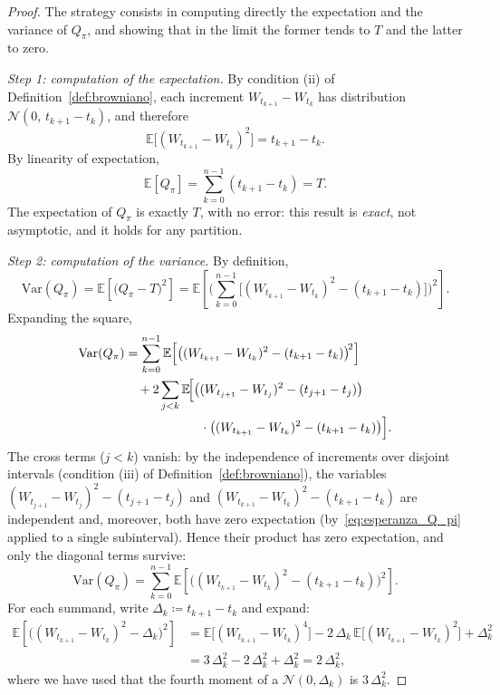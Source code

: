 \documentclass[11pt,a4paper,oneside]{report}
\theoremstyle{plain}
\theoremstyle{definition}
\theoremstyle{remark}
\newcommand{\E}{\mathbb{E}}
\newcommand{\1}{\mathbf{1}}
\newcommand{\eqdef}{\coloneqq}
\begin{document}
\begin{proof}
The strategy consists in computing directly the expectation and the
variance of $Q_\pi$, and showing that in the limit the former tends to
$T$ and the latter to zero.

\emph{Step 1: computation of the expectation.} By condition (ii) of
Definition~\ref{def:browniano}, each increment $W_{t_{k+1}} - W_{t_k}$
has distribution $\mathcal{N}(0,\, t_{k+1} - t_k)$, and therefore
\begin{equation*}
  \E\bigl[(W_{t_{k+1}} - W_{t_k})^2\bigr] = t_{k+1} - t_k.
\end{equation*}
By linearity of expectation,
\begin{equation}\label{eq:esperanza_Q_pi}
  \E[Q_\pi] = \sum_{k=0}^{n-1} (t_{k+1} - t_k) = T.
\end{equation}
The expectation of $Q_\pi$ is exactly $T$, with no error: this result
is \emph{exact}, not asymptotic, and it holds for any partition.

\emph{Step 2: computation of the variance.} By definition,
\begin{equation*}
  \mathrm{Var}(Q_\pi) = \E\!\left[\bigl(Q_\pi - T\bigr)^2\right]
                      = \E\!\left[\biggl(\sum_{k=0}^{n-1}
                          \bigl[(W_{t_{k+1}} - W_{t_k})^2 - (t_{k+1} -
                          t_k)\bigr]\biggr)^{\!2}\right].
\end{equation*}
Expanding the square,
\begin{align*}
  \mathrm{Var}(Q_\pi)
  &= \sum_{k=0}^{n-1} \E\!\left[\bigl((W_{t_{k+1}} - W_{t_k})^2 -
                       (t_{k+1} - t_k)\bigr)^{\!2}\right] \\
  &\quad + 2\sum_{j < k} \E\!\Bigl[\bigl((W_{t_{j+1}} - W_{t_j})^2 -
                  (t_{j+1} - t_j)\bigr) \\
  &\qquad\qquad\qquad \cdot \bigl((W_{t_{k+1}} - W_{t_k})^2 -
                  (t_{k+1} - t_k)\bigr)\Bigr].
\end{align*}
The cross terms ($j < k$) vanish: by the independence of increments
over disjoint intervals (condition (iii) of
Definition~\ref{def:browniano}), the variables
$(W_{t_{j+1}} - W_{t_j})^2 - (t_{j+1} - t_j)$ and
$(W_{t_{k+1}} - W_{t_k})^2 - (t_{k+1} - t_k)$ are independent and,
moreover, both have zero expectation (by~\eqref{eq:esperanza_Q_pi}
applied to a single subinterval). Hence their product has zero
expectation, and only the diagonal terms survive:
\begin{equation*}
  \mathrm{Var}(Q_\pi)
  = \sum_{k=0}^{n-1} \E\!\left[\bigl((W_{t_{k+1}} - W_{t_k})^2 -
                       (t_{k+1} - t_k)\bigr)^{\!2}\right].
\end{equation*}
For each summand, write $\Delta_k \eqdef t_{k+1} - t_k$ and expand:
\begin{align*}
  \E\!\left[\bigl((W_{t_{k+1}} - W_{t_k})^2 - \Delta_k\bigr)^{\!2}\right]
  &= \E\bigl[(W_{t_{k+1}} - W_{t_k})^4\bigr]
   - 2\, \Delta_k\, \E\bigl[(W_{t_{k+1}} - W_{t_k})^2\bigr]
   + \Delta_k^2 \\
  &= 3\, \Delta_k^2 - 2\, \Delta_k^2 + \Delta_k^2 = 2\, \Delta_k^2,
\end{align*}
where we have used that the fourth moment of a
$\mathcal{N}(0, \Delta_k)$ is $3\, \Delta_k^2$.


\end{proof}
\end{document}
